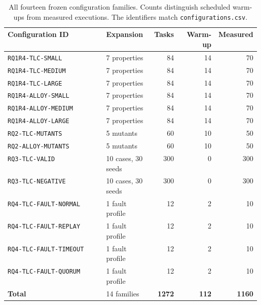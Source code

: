 \begin{table}[htbp]
\centering
\scriptsize
\setlength{\tabcolsep}{2pt}
\caption{All fourteen frozen configuration families. Counts distinguish scheduled warm-ups from measured executions. The identifiers match \texttt{configurations.csv}.}
\label{tab:all-configuration-families}
\begin{tabular}{p{0.39\linewidth}p{0.19\linewidth}rrr}
\hline
Configuration ID & Expansion & Tasks & Warm-up & Measured \\
\hline
\texttt{RQ1R4-TLC-SMALL} & 7 properties & 84 & 14 & 70 \\
\texttt{RQ1R4-TLC-MEDIUM} & 7 properties & 84 & 14 & 70 \\
\texttt{RQ1R4-TLC-LARGE} & 7 properties & 84 & 14 & 70 \\
\texttt{RQ1R4-ALLOY-SMALL} & 7 properties & 84 & 14 & 70 \\
\texttt{RQ1R4-ALLOY-MEDIUM} & 7 properties & 84 & 14 & 70 \\
\texttt{RQ1R4-ALLOY-LARGE} & 7 properties & 84 & 14 & 70 \\
\texttt{RQ2-TLC-MUTANTS} & 5 mutants & 60 & 10 & 50 \\
\texttt{RQ2-ALLOY-MUTANTS} & 5 mutants & 60 & 10 & 50 \\
\texttt{RQ3-TLC-VALID} & 10 cases, 30 seeds & 300 & 0 & 300 \\
\texttt{RQ3-TLC-NEGATIVE} & 10 cases, 30 seeds & 300 & 0 & 300 \\
\texttt{RQ4-TLC-FAULT-NORMAL} & 1 fault profile & 12 & 2 & 10 \\
\texttt{RQ4-TLC-FAULT-REPLAY} & 1 fault profile & 12 & 2 & 10 \\
\texttt{RQ4-TLC-FAULT-TIMEOUT} & 1 fault profile & 12 & 2 & 10 \\
\texttt{RQ4-TLC-FAULT-QUORUM} & 1 fault profile & 12 & 2 & 10 \\
\hline
\textbf{Total} & 14 families & \textbf{1272} & \textbf{112} & \textbf{1160} \\
\hline
\end{tabular}
\end{table}
